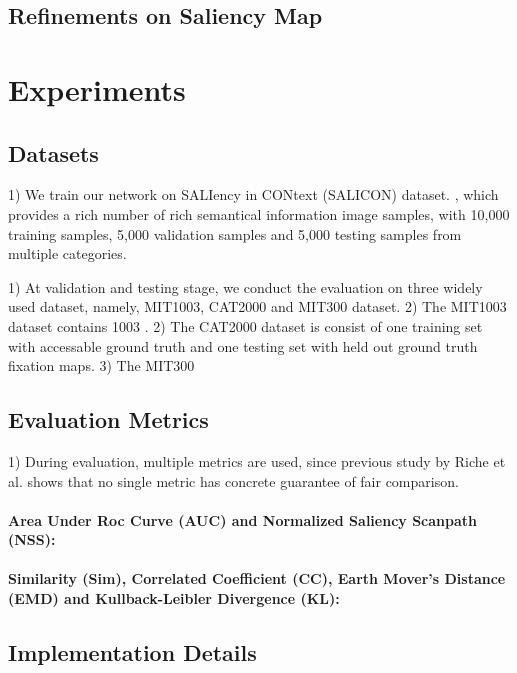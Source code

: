 \documentclass[twoside,twocolumn]{article}
\begin{document}
\subsection{Refinements on Saliency Map}

\section{Experiments}

\subsection{Datasets}

\par 1) We train our network on SALIency in CONtext (SALICON) dataset. \cite{jiang2015salicon}, which provides a rich number of rich semantical information image samples, with 10,000 training samples, 5,000 validation samples and 5,000 testing samples from multiple categories. 

\par 1) At validation and testing stage, we conduct the evaluation on three widely used dataset, namely, MIT1003, CAT2000 and MIT300 dataset. 2) The MIT1003 dataset contains 1003 . 2) The CAT2000 dataset is consist of one training set with accessable ground truth and one testing set with held out ground truth fixation maps. 3) The MIT300 

\subsection{Evaluation Metrics}

\par 1) During evaluation, multiple metrics are used, since previous study by Riche et al. \cite{riche2013saliency} shows that no single metric has concrete guarantee of fair comparison. 

\paragraph{Area Under Roc Curve (AUC) and Normalized Saliency Scanpath (NSS):}

\paragraph{Similarity (Sim), Correlated Coefficient (CC), Earth Mover's Distance (EMD) and Kullback-Leibler Divergence (KL):}

\subsection{Implementation Details}
\end{document}
